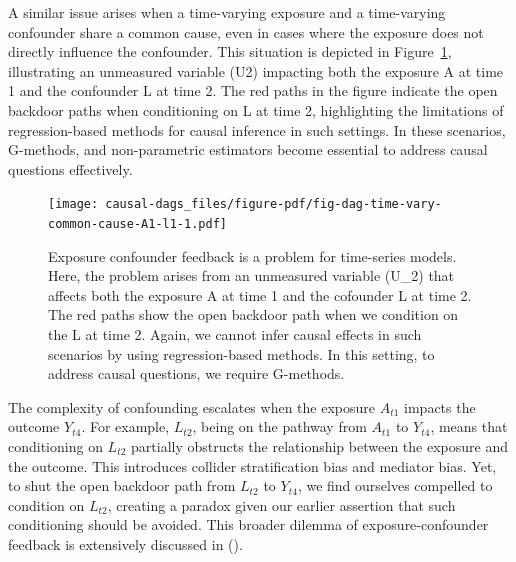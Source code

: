 \documentclass[
  singlecolumn,
  9pt]{article}
\begin{document}
A similar issue arises when a time-varying exposure and a time-varying
confounder share a common cause, even in cases where the exposure does
not directly influence the confounder. This situation is depicted in
Figure~\ref{fig-dag-time-vary-common-cause-A1-l1}, illustrating an
unmeasured variable (U2) impacting both the exposure A at time 1 and the
confounder L at time 2. The red paths in the figure indicate the open
backdoor paths when conditioning on L at time 2, highlighting the
limitations of regression-based methods for causal inference in such
settings. In these scenarios, G-methods, and non-parametric estimators
become essential to address causal questions effectively.

\begin{figure}

{\centering \texttt{[image: causal-dags\_files/figure-pdf/fig-dag-time-vary-common-cause-A1-l1-1.pdf]}

}

\caption{\label{fig-dag-time-vary-common-cause-A1-l1}Exposure confounder
feedback is a problem for time-series models. Here, the problem arises
from an unmeasured variable (U\_2) that affects both the exposure A at
time 1 and the cofounder L at time 2. The red paths show the open
backdoor path when we condition on the L at time 2. Again, we cannot
infer causal effects in such scenarios by using regression-based
methods. In this setting, to address causal questions, we require
G-methods.}

\end{figure}

The complexity of confounding escalates when the exposure \(A_{t1}\)
impacts the outcome \(Y_{t4}\). For example, \(L_{t2}\), being on the
pathway from \(A_{t1}\) to \(Y_{t4}\), means that conditioning on
\(L_{t2}\) partially obstructs the relationship between the exposure and
the outcome. This introduces collider stratification bias and mediator
bias. Yet, to shut the open backdoor path from \(L_{t2}\) to \(Y_{t4}\),
we find ourselves compelled to condition on \(L_{t2}\), creating a
paradox given our earlier assertion that such conditioning should be
avoided. This broader dilemma of exposure-confounder feedback is
extensively discussed in ().
\end{document}
